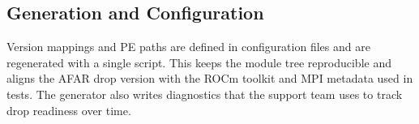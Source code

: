 \subsection{Generation and Configuration}
\label{sec:generator}
Version mappings and PE paths are defined in configuration files and are
regenerated with a single script. This keeps the module tree reproducible and
aligns the AFAR drop version with the ROCm toolkit and MPI metadata used in
tests. The generator also writes diagnostics that the support team uses to
track drop readiness over time.

